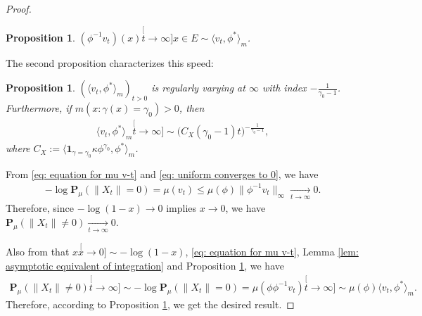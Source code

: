 \documentclass[12pt,a4paper]{amsart}
\newtheorem{prop}[thm]{Proposition}
\theoremstyle{definition}
\numberwithin{equation}{section}
\begin{document}
\begin{proof}
  \begin{prop}
    \label{prop: convergence in a same speed}
    $(\phi^{-1}v_t)(x) \stackrel[t\to\infty]{x\in E}{\sim} \langle v_t,\phi^*\rangle_m$.
  \end{prop}
  \label{prop: asymptotic equivalence of vtphi}
  The second proposition characterizes this speed:
  \begin{prop}
    \label{prop: regularly varying of vt-phi-star}
    $(\langle v_t,\phi^*\rangle_m)_{t> 0} $ is regularly varying at $\infty$ with index $-\frac{1}{\gamma_0-1}$.
    Furthermore, if $m(x: \gamma (x)= \gamma_0)>0$, then
    \begin{align}
      \langle v_t,\phi^*\rangle_m
      \stackrel[t\to \infty]{}{\sim} \big(C_X(\gamma_0-1) t \big)^{-\frac{1}{\gamma_0 - 1}},
    \end{align}
    where $C_X:= \langle \mathbf 1_{\gamma= \gamma_0} \kappa \phi^{\gamma_0}, \phi^* \rangle_m $.
  \end{prop}
    From \eqref{eq: equation for mu v-t} and \eqref{eq: uniform converges to 0}, we have
    \begin{align}
      - \log \mathbf P_\mu(\|X_t\| = 0)
      = \mu(v_t)
      \leq \mu(\phi) \| \phi^{-1} v_t\|_{\infty}
      \xrightarrow[t\to \infty]{} 0.
    \end{align}
    Therefore, since $- \log (1-x) \to 0$ implies $x \to 0$, we have $\mathbf P_\mu(\|X_t\| \neq 0) \xrightarrow[t\to \infty]{} 0$.

    Also from that $x \stackrel[x\to 0]{}{\sim} - \log(1-x)$, \eqref{eq: equation for mu v-t}, Lemma \ref{lem: asymptotic equivalent of integration} and Proposition \ref{prop: convergence in a same speed}, we have
    \begin{align}
      \mathbf P_\mu(\|X_t\| \neq 0)
      \stackrel[t\to \infty]{}{\sim} - \log \mathbf P_\mu(\|X_t\| = 0)
      = \mu(\phi \phi^{-1}v_t)
      \stackrel[t\to\infty]{}{\sim} \mu(\phi) \langle v_t, \phi^*\rangle_m.
    \end{align}
    Therefore, according to Proposition \ref{prop: regularly varying of vt-phi-star}, we get the desired result.
\end{proof}
\end{document}
